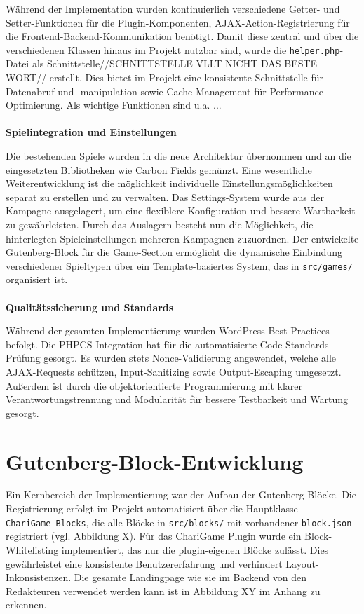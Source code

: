 Während der Implementation wurden kontinuierlich verschiedene Getter- und Setter-Funktionen für die Plugin-Komponenten, AJAX-Action-Registrierung für die Frontend-Backend-Kommunikation benötigt.
Damit diese zentral und über die verschiedenen Klassen hinaus im Projekt nutzbar sind, wurde die \texttt{helper.php}-Datei als Schnittstelle//SCHNITTSTELLE VLLT NICHT DAS BESTE WORT// erstellt.
Dies bietet im Projekt eine konsistente Schnittstelle für Datenabruf und -manipulation sowie Cache-Management für Performance-Optimierung.
Als wichtige Funktionen sind u.a. ...
\\\\
\textbf{Spielintegration und Einstellungen}

Die bestehenden Spiele wurden in die neue Architektur übernommen und an die eingesetzten Bibliotheken wie Carbon Fields gemünzt.
Eine wesentliche Weiterentwicklung ist die möglichkeit individuelle Einstellungsmöglichkeiten separat zu erstellen und zu verwalten.
Das Settings-System wurde aus der Kampagne ausgelagert, um eine flexiblere Konfiguration und bessere Wartbarkeit zu gewährleisten.
Durch das Auslagern besteht nun die Möglichkeit, die hinterlegten Spieleinstellungen mehreren Kampagnen zuzuordnen.
Der entwickelte Gutenberg-Block für die Game-Section ermöglicht die dynamische Einbindung verschiedener Spieltypen über ein Template-basiertes System, das in \texttt{src/games/} organisiert ist.
\\\\
\textbf{Qualitätssicherung und Standards}

Während der gesamten Implementierung wurden WordPress-Best-Practices befolgt.
Die PHPCS-Integration hat für die automatisierte Code-Standards-Prüfung gesorgt.
Es wurden stets Nonce-Validierung angewendet, welche alle AJAX-Requests schützen, Input-Sanitizing sowie Output-Escaping umgesetzt.
Außerdem ist durch die objektorientierte Programmierung mit klarer Verantwortungstrennung und Modularität für bessere Testbarkeit und Wartung gesorgt.

\section{Gutenberg-Block-Entwicklung}

Ein Kernbereich der Implementierung war der Aufbau der Gutenberg-Blöcke.
Die Registrierung erfolgt im Projekt automatisiert über die Hauptklasse \texttt{ChariGame\_Blocks}, die alle Blöcke in \texttt{src/blocks/} mit vorhandener \texttt{block.json} registriert (vgl. Abbildung X). %
Für das ChariGame Plugin wurde ein Block-Whitelisting implementiert, das nur die plugin-eigenen Blöcke zulässt.
Dies gewährleistet eine konsistente Benutzererfahrung und verhindert Layout-Inkonsistenzen.
Die gesamte Landingpage wie sie im Backend von den Redakteuren verwendet werden kann ist in Abbildung XY im Anhang zu erkennen. %

